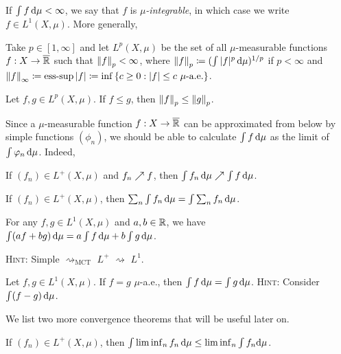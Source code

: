 \documentclass[reqno, twoside]{article}
\begin{document}
    If $\int f\,\mathrm{d}\mu<\infty$, we say that $f$ is \textit{$\mu$-integrable}, in which case we write $f\in L^1(X,\mu)$. More generally,

    \begin{definition}
        Take $p\in[1,\infty]$ and let $L^p(X,\mu)$ be the set of all $\mu$-measurable functions $f:X\to\overline{\mathbb{R}}$ such that $\left\|f\right\|_p<\infty$, where $\left\|f\right\|_p\coloneqq(\int|f|^p\,\mathrm{d}\mu)^{1/p}$ if $p<\infty$ and $\left\|f\right\|_\infty\coloneqq\operatorname{ess-sup}|f|\coloneqq\inf\left\{c\geq0:|f|\leq c\textrm{ $\mu$-a.e.}\right\}$.
    \end{definition}

    \begin{exercise}
        Let $f,g\in L^p(X,\mu)$. If $f\leq g$, then $\left\|f\right\|_p\leq\left\|g\right\|_p$.
    \end{exercise}

    Since a $\mu$-measurable function $f:X\to\overline{\mathbb{R}}$ can be approximated from below by simple functions $(\phi_n)$, we should be able to calculate $\int f\,\mathrm{d}\mu$ as the limit of $\int\varphi_n\,\mathrm{d}\mu$. Indeed,

    \begin{theorem}
        If $(f_n)\in L^+(X,\mu)$ and $f_n\nearrow f$, then $\int f_n\,\mathrm{d}\mu\nearrow\int f\,\mathrm{d}\mu$.
    \end{theorem}

    \begin{corollary}
        If $(f_n)\in L^+(X,\mu)$, then $\sum_n\int f_n\,\mathrm{d}\mu=\int\sum_nf_n\,\mathrm{d}\mu$.
    \end{corollary}

    \begin{exercise}
        For any $f,g\in L^1(X,\mu)$ and $a,b\in\mathbb{R}$, we have $\int(af+bg)\,\mathrm{d}\mu=a\int f\,\mathrm{d}\mu+b\int g\,\mathrm{d}\mu$.

        \textsc{Hint:} Simple $\rightsquigarrow_\textrm{MCT}$ $L^+$ $\rightsquigarrow$ $L^1$.
    \end{exercise}

    \begin{exercise}
        Let $f,g\in L^1(X,\mu)$. If $f=g$ $\mu$-a.e., then $\int f\,\mathrm{d}\mu=\int g\,\mathrm{d}\mu$. \textsc{Hint:} Consider $\int(f-g)\,\mathrm{d}\mu$.
    \end{exercise}

    We list two more convergence theorems that will be useful later on.

    \begin{theorem}
        If $(f_n)\in L^+(X,\mu)$, then $\int\liminf_nf_n\,\mathrm{d}\mu\leq\liminf_n\int f_n\mathrm{d}\mu$.
    \end{theorem}
\end{document}
